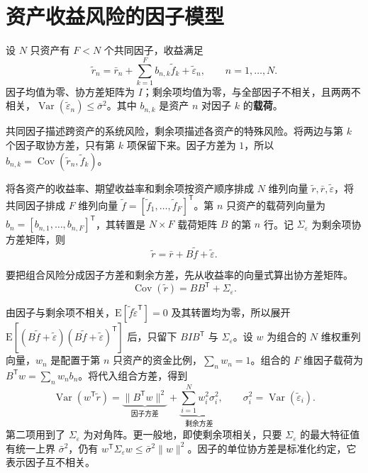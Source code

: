 \section{资产收益风险的因子模型}\label{sec:wj-fourteen-1}
\begin{tcolorbox}[knowledge]
设 $N$ 只资产有 $F<N$ 个共同因子，收益满足
\begin{equation}
 \widetilde r_n=\bar r_n+\sum_{k=1}^F b_{n,k}\widetilde f_k+\widetilde\varepsilon_n,
 \qquad n=1,\ldots,N.\label{eq:wj-14-1}
\end{equation}
因子均值为零、协方差矩阵为 $I$；剩余项均值为零，与全部因子不相关，且两两不相关，$\operatorname{Var}(\widetilde\varepsilon_n)\le\bar\sigma^2$。其中 $b_{n,k}$ 是资产 $n$ 对因子 $k$ 的\textbf{载荷}。
\end{tcolorbox}

共同因子描述跨资产的系统风险，剩余项描述各资产的特殊风险。将两边与第 $k$ 个因子取协方差，只有第 $k$ 项保留下来。因子方差为 $1$，所以 $b_{n,k}=\operatorname{Cov}(\widetilde r_n,\widetilde f_k)$。

将各资产的收益率、期望收益率和剩余项按资产顺序排成 $N$ 维列向量 $\widetilde r,\bar r,\widetilde\varepsilon$，将共同因子排成 $F$ 维列向量 $\widetilde f=[\widetilde f_1,\ldots,\widetilde f_F]^{\mathsf T}$。第 $n$ 只资产的载荷列向量为 $b_n=[b_{n,1},\ldots,b_{n,F}]^{\mathsf T}$，其转置是 $N\times F$ 载荷矩阵 $B$ 的第 $n$ 行。记 $\Sigma_\varepsilon$ 为剩余项协方差矩阵，则
\begin{equation}
 \widetilde r=\bar r+B\widetilde f+\widetilde\varepsilon.
 \label{eq:wj-14-2}
\end{equation}

要把组合风险分成因子方差和剩余方差，先从收益率的向量式算出协方差矩阵。
\begin{equation*}
 \operatorname{Cov}(\widetilde r)=BB^{\mathsf T}+\Sigma_\varepsilon.
 \tag{14.I}\label{eq:wj-14-factor-covariance}
\end{equation*}

由因子与剩余项不相关，$\mathrm E[\widetilde f\widetilde\varepsilon^{\mathsf T}]=0$ 及其转置均为零，所以展开 $\mathrm E[(B\widetilde f+\widetilde\varepsilon)(B\widetilde f+\widetilde\varepsilon)^{\mathsf T}]$ 后，只留下 $BIB^{\mathsf T}$ 与 $\Sigma_\varepsilon$。设 $w$ 为组合的 $N$ 维权重列向量，$w_n$ 是配置于第 $n$ 只资产的资金比例，$\sum_n w_n=1$。组合的 $F$ 维因子载荷为 $B^{\mathsf T}w=\sum_n w_nb_n$。将代入组合方差，得到
\begin{equation*}
 \operatorname{Var}(w^{\mathsf T}\widetilde r)
 =\underbrace{\|B^{\mathsf T}w\|^2}_{\text{因子方差}}
 +\underbrace{\sum_{i=1}^N w_i^2\sigma_i^2}_{\text{剩余方差}},
 \qquad \sigma_i^2=\operatorname{Var}(\widetilde\varepsilon_i).
 \tag{14.II}\label{eq:wj-14-portfolio-factor-variance}
\end{equation*}
第二项用到了 $\Sigma_\varepsilon$ 为对角阵。更一般地，即使剩余项相关，只要 $\Sigma_\varepsilon$ 的最大特征值有统一上界 $\bar\sigma^2$，仍有 $w^{\mathsf T}\Sigma_\varepsilon w\le\bar\sigma^2\|w\|^2$。因子的单位协方差是标准化约定，它表示因子互不相关。

